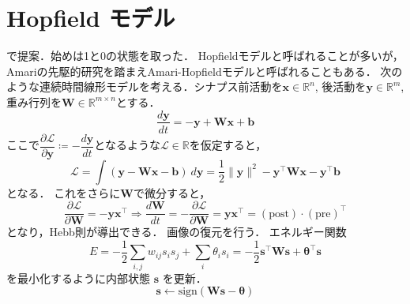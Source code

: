 \section{Hopfield モデル}
\citep{Hopfield1982-vu}で提案．始めは1と0の状態を取った．
Hopfieldモデルと呼ばれることが多いが，Amariの先駆的研究\citep{Amari1972-fq}を踏まえAmari-Hopfieldモデルと呼ばれることもある．
次のような連続時間線形モデルを考える．シナプス前活動を$\mathbf{x}\in \mathbb{R}^n$, 後活動を$\mathbf{y}\in \mathbb{R}^m$, 重み行列を$\mathbf{W}\in \mathbb{R}^{m\times n}$とする．
\begin{equation}
\frac{d\mathbf{y}}{dt}=-\mathbf{y}+\mathbf{W}\mathbf{x}+\mathbf{b}
\end{equation}
ここで$\dfrac{\partial\mathcal{L}}{\partial\mathbf{y}}\coloneqq -\dfrac{d\mathbf{y}}{dt}$となるような$\mathcal{L}\in \mathbb{R}$を仮定すると，
\begin{equation}
\mathcal{L}=\int \left(\mathbf{y}-\mathbf{W}\mathbf{x}-\mathbf{b}\right)\ d\mathbf{y}=\frac{1}{2}\|\mathbf{y}\|^2-\mathbf{y}^\top \mathbf{W}\mathbf{x}-\mathbf{y}^\top \mathbf{b}
\end{equation}
となる． これをさらに$\mathbf{W}$で微分すると，
\begin{equation}
\dfrac{\partial\mathcal{L}}{\partial\mathbf{W}}=-\mathbf{y}\mathbf{x}^\top\Rightarrow
\frac{d\mathbf{W}}{dt}=-\dfrac{\partial\mathcal{L}}{\partial\mathbf{W}}=\mathbf{y}\mathbf{x}^\top=(\text{post})\cdot (\text{pre})^\top
\end{equation}
となり，Hebb則が導出できる．
画像の復元を行う．
エネルギー関数
\begin{equation}
E=-{\frac 12}\sum _{{i,j}}{w_{{ij}}{s_{i}}{s_{j}}}+\sum _{i}{\theta _{i}}{s_{i}}=-{\frac 12}\mathbf{s}^\top\mathbf{W}\mathbf{s}+\mathbf{\theta}^\top\mathbf{s}
\end{equation}
を最小化するように内部状態 $\mathbf{s}$ を更新．
\begin{equation}
\mathbf{s}\leftarrow \text{sign}\left(\mathbf{W}\mathbf{s}-\mathbf{\theta}\right)
\end{equation}
